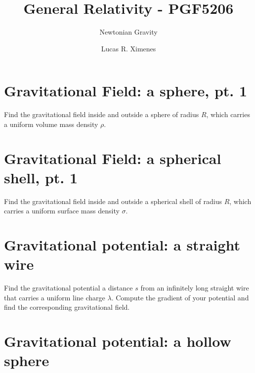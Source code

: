 \documentclass[a4paper, 11pt, oneside]{impression}
\title{General Relativity - PGF5206} %
\subtitle{Newtonian Gravity} %
\author{Lucas R. Ximenes} %
\begin{document}
\maketitle

\chapter{Gravitational Field: a sphere, pt. 1}\label{quest: one}

\begin{exercise}{}
    Find the gravitational field inside and outside a sphere of radius $R$, which carries a uniform volume mass density $\rho$.
\end{exercise}



\newpage

\chapter{Gravitational Field: a spherical shell, pt. 1}\label{quest: two}

\begin{exercise}{}
    Find the gravitational field inside and outside a spherical shell of radius $R$, which carries a uniform surface mass density $\sigma$.
\end{exercise}



\newpage

\chapter{Gravitational potential: a straight wire}\label{quest: three}

\begin{exercise}{}
    Find the gravitational potential a distance $s$ from an infinitely long straight wire that carries a uniform line charge $\lambda$. Compute the gradient of your potential and find the corresponding gravitational field.
\end{exercise}



\newpage

\chapter{Gravitational potential: a hollow sphere}\label{quest: four}
\end{document}
